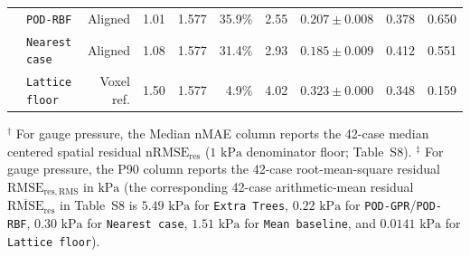 \documentclass[11pt]{article}
\begin{document}
\begin{table}[!htbp]
{\begin{tabular}{llrrrrrrrr}
 & \texttt{POD-RBF} & Aligned & 1.01 & 1.577 & 35.9\% & 2.55 & $0.207 \pm 0.008$ & 0.378 & 0.650 \\
 & \texttt{Nearest case} & Aligned & 1.08 & 1.577 & 31.4\% & 2.93 & $0.185 \pm 0.009$ & 0.412 & 0.551 \\
 & \texttt{Lattice floor} & Voxel ref. & 1.50 & 1.577 & 4.9\% & 4.02 & $0.323 \pm 0.000$ & 0.348 & 0.159 \\
\bottomrule
\end{tabular}%
}
\begin{flushleft}\footnotesize $^\dagger$ For gauge pressure, the Median nMAE column reports the 42-case median centered spatial residual $\mathrm{nRMSE}_{\mathrm{res}}$ ($1\text{ kPa}$ denominator floor; Table~S8). $^\ddagger$ For gauge pressure, the P90 column reports the 42-case root-mean-square residual $\mathrm{RMSE}_{\mathrm{res,RMS}}$ in $\text{kPa}$ (the corresponding 42-case arithmetic-mean residual $\overline{\mathrm{RMSE}}_{\mathrm{res}}$ in Table~S8 is $5.49\text{ kPa}$ for \texttt{Extra Trees}, $0.22\text{ kPa}$ for \texttt{POD-GPR}/\texttt{POD-RBF}, $0.30\text{ kPa}$ for \texttt{Nearest case}, $1.51\text{ kPa}$ for \texttt{Mean baseline}, and $0.0141\text{ kPa}$ for \texttt{Lattice floor}).\end{flushleft}
\end{table}
\end{document}
